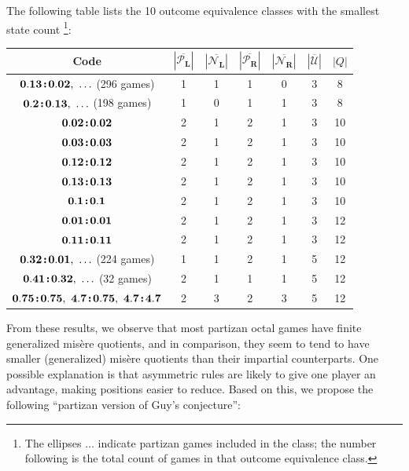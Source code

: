\documentclass[11pt]{article}
\theoremstyle{definition}
\theoremstyle{plain}
\newcommand{\varP}{\mathcal{P}}
\newcommand{\varN}{\mathcal{N}}
\newcommand{\rmL}{\mathbf{L}}
\newcommand{\rmR}{\mathbf{R}}
\newcommand{\varU}{\mathcal{U}}
\newcommand{\col}{\textbf{\;\!:\!\;}}
\begin{document}
The following table lists the 10 outcome equivalence classes with the smallest state count
\footnote{The ellipses $\ldots$ indicate partizan games included in the class; the number following is the total count of games in that outcome equivalence class.}:
\begin{center}
    \begin{tabular}{|c|cccc|c|c|}
        \hline
        Code & $|\overline{\varP_\rmL}|$ & $|\overline{\varN_\rmL}|$ & $|\overline{\varP_\rmR}|$ & $|\overline{\varN_\rmR}|$ & $|\overline{\varU}|$ & $|Q|$ \\
        \hline
        $\mathbf{0.13\col0.02},\ \ldots$ (296 games)      & 1  & 1  & 1  & 0  & 3   & 8 \\
        $\mathbf{0.2\col0.13},\ \ldots$ (198 games)       & 1  & 0  & 1  & 1  & 3   & 8 \\
        $\mathbf{0.02\col0.02}$                     & 2  & 1  & 2  & 1  & 3   & 10 \\
        $\mathbf{0.03\col0.03}$                     & 2  & 1  & 2  & 1  & 3   & 10 \\
        $\mathbf{0.12\col0.12}$                     & 2  & 1  & 2  & 1  & 3   & 10 \\
        $\mathbf{0.13\col0.13}$                     & 2  & 1  & 2  & 1  & 3   & 10 \\
        $\mathbf{0.1\col0.1}$                       & 2  & 1  & 2  & 1  & 3   & 10 \\
        $\mathbf{0.01\col0.01}$                     & 2  & 1  & 2  & 1  & 3   & 12 \\
        $\mathbf{0.11\col0.11}$                     & 2  & 1  & 2  & 1  & 3   & 12 \\
        $\mathbf{0.32\col0.01},\ \ldots$ (224 games)      & 1  & 1  & 2  & 1  & 5   & 12 \\
        $\mathbf{0.41\col0.32},\ \ldots$ (32 games)       & 2  & 1  & 1  & 1  & 5   & 12 \\
        $\mathbf{0.75\col0.75},\ \mathbf{4.7\col0.75},\ \mathbf{4.7\col4.7}$ & 2  & 3  & 2  & 3  & 5   & 12 \\
        \hline
    \end{tabular}
\end{center}


From these results, we observe that most partizan octal games have finite generalized misère quotients,
and in comparison, they seem to tend to have smaller (generalized) misère quotients than their impartial counterparts.
One possible explanation is that asymmetric rules are likely to give one player an advantage, making positions easier to reduce.
Based on this, we propose the following ``partizan version of Guy's conjecture'':
\end{document}
